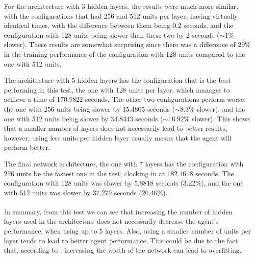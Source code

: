 For the architecture with 3 hidden layers, the results were much more similar, with the configurations that had 256 and 512 units per layer, having virtually identical times, with the difference between them being 0.2 seconds, and the configuration with 128 units being slower than these two by 2 seconds ($\sim1\%$ slower). These results are somewhat surprising since there was a difference of $29\%$ in the training performance of the configuration with 128 units compared to the one with 512 units.

The architecture with 5 hidden layers has the configuration that is the best performing in this test, the one with 128 units per layer, which manages to achieve a time of 170.9822 seconds. The other two configurations perform worse, the one with 256 units being slower by 15.4805 seconds ($\sim8.3\%$ slower), and the one with 512 units being slower by 34.8443 seconds ($\sim16.92\%$ slower). This shows that a smaller number of layers does not necessarily lead to better results, however, using less units per hidden layer usually means that the agent will perform better.

The final network architecture, the one with 7 layers has the configuration with 256 units be the fastest one in the test, clocking in at 182.1618 seconds. The configuration with 128 units was slower by 5.8818 seconds ($3.22\%$), and the one with 512 units was slower by 37.279 seconds ($20.46\%$).

\paragraph{}
In summary, from this test we can see that increasing the number of hidden layers used in the architecture does not necessarily decrease the agent's performance, when using up to 5 layers. Also, using a smaller number of units per layer tends to lead to better agent performance. This could be due to the fact that, according to \cite{eldan2016powerofdepth}, increasing the width of the network can lead to overfitting.

